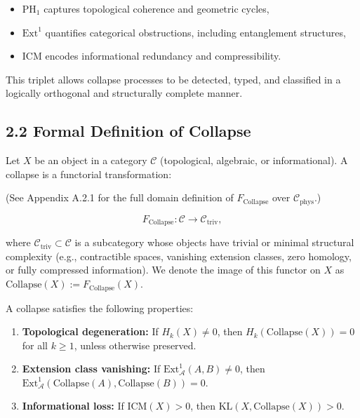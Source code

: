 \documentclass[11pt]{article}
\begin{document}
\begin{itemize}
    \item \( \mathrm{PH}_1 \) captures topological coherence and geometric cycles,
    \item \( \mathrm{Ext}^1 \) quantifies categorical obstructions, including entanglement structures,
    \item \( \mathrm{ICM} \) encodes informational redundancy and compressibility.
\end{itemize}

This triplet allows collapse processes to be detected, typed, and classified in a logically orthogonal and structurally complete manner.


\subsection*{2.2 Formal Definition of Collapse}

Let \( X \) be an object in a category \( \mathcal{C} \) (topological, algebraic, or informational). A collapse is a functorial transformation:

(See Appendix A.2.1 for the full domain definition of \( F_{\mathrm{Collapse}} \) over \(\mathcal{C}_{\mathrm{phys}}\).)

\[
F_{\mathrm{Collapse}} : \mathcal{C} \longrightarrow \mathcal{C}_{\mathrm{triv}},
\]

where \( \mathcal{C}_{\mathrm{triv}} \subset \mathcal{C} \) is a subcategory whose objects have trivial or minimal structural complexity (e.g., contractible spaces, vanishing extension classes, zero homology, or fully compressed information). We denote the image of this functor on \( X \) as \( \mathrm{Collapse}(X) := F_{\mathrm{Collapse}}(X) \).

A collapse satisfies the following properties:

\begin{enumerate}
    \item \textbf{Topological degeneration:} If \( H_k(X) \neq 0 \), then \( H_k(\mathrm{Collapse}(X)) = 0 \) for all \( k \geq 1 \), unless otherwise preserved.
    \item \textbf{Extension class vanishing:} If \( \mathrm{Ext}^1_{\mathcal{A}}(A,B) \neq 0 \), then \( \mathrm{Ext}^1_{\mathcal{A}}(\mathrm{Collapse}(A), \mathrm{Collapse}(B)) = 0 \).
    \item \textbf{Informational loss:} If \( \mathrm{ICM}(X) > 0 \), then \( \mathrm{KL}(X, \mathrm{Collapse}(X)) > 0 \).
\end{enumerate}
\end{document}
